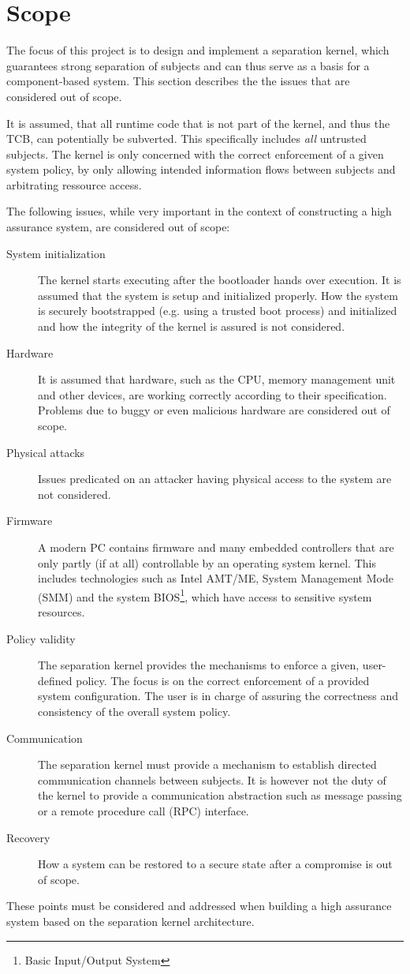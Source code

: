 \section{Scope}
The focus of this project is to design and implement a separation kernel, which
guarantees strong separation of subjects and can thus serve as a basis for a
component-based system. This section describes the the issues that are
considered out of scope.

It is assumed, that all runtime code that is not part of the kernel, and thus
the TCB, can potentially be subverted. This specifically includes \emph{all}
untrusted subjects. The kernel is only concerned with the correct enforcement of
a given system policy, by only allowing intended information flows between
subjects and arbitrating ressource access.

The following issues, while very important in the context of constructing a
high assurance system, are considered out of scope:

\begin{description}
	\item[System initialization] The kernel starts executing after the
		bootloader hands over execution. It is assumed that the system is setup
		and initialized properly. How the system is securely bootstrapped (e.g.
		using a trusted boot process) and initialized and how the integrity of
		the kernel is assured is not considered.
	\item[Hardware] It is assumed that hardware, such as the CPU, memory
		management unit and other devices, are working correctly according to
		their specification. Problems due to buggy or even malicious hardware
		are considered out of scope.
	\item[Physical attacks] Issues predicated on an attacker having physical
		access to the system are not considered.
	\item[Firmware] A modern PC contains firmware and many embedded controllers
		that are only partly (if at all) controllable by an operating system
		kernel. This includes technologies such as Intel AMT/ME, System
		Management Mode (SMM) and the system BIOS\footnote{Basic
		Input/Output System}, which have access to sensitive system resources.
	\item[Policy validity] The separation kernel provides the mechanisms to
		enforce a given, user-defined policy. The focus is on the correct
		enforcement of a provided system configuration. The user is in charge of
		assuring the correctness and consistency of the overall system policy.
	\item[Communication] The separation kernel must provide a mechanism to
		establish directed communication channels between subjects.	It is
		however not the duty of the kernel to provide a	communication
		abstraction such as message passing or a remote procedure call (RPC)
		interface.
	\item[Recovery] How a system can be restored to a secure state after a
		compromise is out of scope.
\end{description}

These points must be considered and addressed when building a high assurance
system based on the separation kernel architecture.
